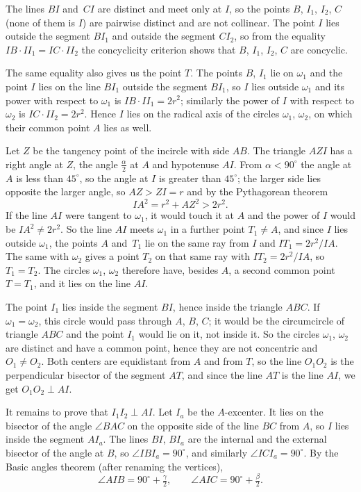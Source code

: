 {    The lines $BI$ and~$CI$ are distinct and meet only at $I$, so the points $B$, $I_1$, $I_2$, $C$ (none of them is $I$) are pairwise distinct and are not collinear. The point $I$ lies outside the segment $BI_1$ and outside the segment $CI_2$, so from the equality $IB \cdot II_1 = IC \cdot II_2$ the concyclicity criterion shows that $B$, $I_1$, $I_2$, $C$ are concyclic.

    The same equality also gives us the point $T$. The points $B$, $I_1$ lie on $\omega_1$ and the point $I$ lies on the line $BI_1$ outside the segment $BI_1$, so $I$ lies outside $\omega_1$ and its power with respect to $\omega_1$ is $IB \cdot II_1 = 2r^2$; similarly the power of $I$ with respect to $\omega_2$ is $IC \cdot II_2 = 2r^2$. Hence $I$ lies on the radical axis of the circles $\omega_1$, $\omega_2$, on which their common point $A$ lies as well.

    Let $Z$ be the tangency point of the incircle with side $AB$. The triangle $AZI$ has a right angle at $Z$, the angle $\frac\alpha2$ at $A$ and hypotenuse $AI$. From $\alpha < 90^\circ$ the angle at $A$ is less than $45^\circ$, so the angle at $I$ is greater than $45^\circ$; the larger side lies opposite the larger angle, so $AZ > ZI = r$ and by the Pythagorean theorem
    $$
    IA^2 = r^2 + AZ^2 > 2r^2.
    $$
    If the line $AI$ were tangent to $\omega_1$, it would touch it at $A$ and the power of $I$ would be $IA^2 \neq 2r^2$. So the line $AI$ meets $\omega_1$ in a further point $T_1 \neq A$, and since $I$ lies outside $\omega_1$, the points $A$ and~$T_1$ lie on the same ray from $I$ and $IT_1 = 2r^2/IA$. The same with $\omega_2$ gives a point $T_2$ on that same ray with $IT_2 = 2r^2/IA$, so $T_1 = T_2$. The circles $\omega_1$, $\omega_2$ therefore have, besides $A$, a second common point $T = T_1$, and it lies on the line $AI$.

    The point $I_1$ lies inside the segment $BI$, hence inside the triangle $ABC$. If $\omega_1 = \omega_2$, this circle would pass through $A$, $B$, $C$; it would be the circumcircle of triangle $ABC$ and the point $I_1$ would lie on it, not inside it. So the circles $\omega_1$, $\omega_2$ are distinct and have a common point, hence they are not concentric and $O_1 \neq O_2$. Both centers are equidistant from $A$ and from $T$, so the line $O_1O_2$ is the perpendicular bisector of the segment $AT$, and since the line $AT$ is the line $AI$, we get $O_1O_2 \perp AI$.

    It remains to prove that $I_1I_2 \perp AI$. Let $I_a$ be the $A$-excenter. It lies on the bisector of the angle $\angle BAC$ on the opposite side of the line $BC$ from $A$, so $I$ lies inside the segment $AI_a$. The lines $BI$, $BI_a$ are the internal and the external bisector of the angle at $B$, so $\angle IBI_a = 90^\circ$, and similarly $\angle ICI_a = 90^\circ$. By the Basic angles theorem (after renaming the vertices),
    $$
    \angle AIB = 90^\circ + \tfrac\gamma2, \qquad \angle AIC = 90^\circ + \tfrac\beta2.
    $$

}
